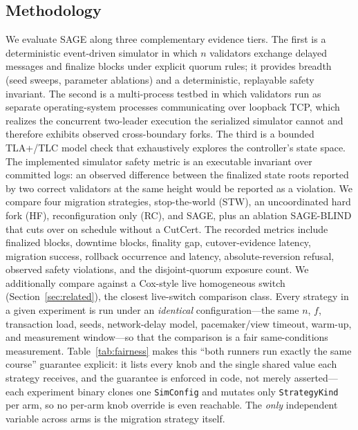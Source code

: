 \documentclass[journal]{IEEEtran}
\theoremstyle{definition}
\theoremstyle{remark}
\begin{document}
\subsection{Methodology}
We evaluate SAGE along three complementary evidence tiers. The first is a
deterministic event-driven simulator in which $n$ validators exchange delayed messages and
finalize blocks under explicit quorum rules; it provides breadth (seed sweeps, parameter
ablations) and a deterministic, replayable safety invariant. The second is a multi-process
testbed in which validators run as separate operating-system processes communicating over
loopback TCP, which realizes the concurrent two-leader execution the serialized simulator cannot
and therefore exhibits observed cross-boundary forks. The third is a bounded TLA+/TLC model check
that exhaustively explores the controller's state space. The implemented simulator safety metric
is an executable invariant over committed logs: an observed difference between the finalized state
roots reported by two correct validators at the same height would be reported as a violation. We compare
four migration strategies, stop-the-world (STW), an uncoordinated hard fork (HF),
reconfiguration only (RC), and SAGE, plus an ablation SAGE-BLIND that cuts over on schedule
without a CutCert. The recorded metrics include finalized blocks, downtime blocks,
finality gap, cutover-evidence latency, migration success, rollback occurrence and latency,
absolute-reversion refusal, observed safety violations, and the disjoint-quorum exposure count.
We additionally compare against a Cox-style live homogeneous switch (Section~\ref{sec:related}),
the closest live-switch comparison class. Every strategy in a given experiment is run under an
\emph{identical} configuration---the same $n$, $f$, transaction load, seeds, network-delay model,
pacemaker/view timeout, warm-up, and measurement window---so that the comparison is a fair
same-conditions measurement. Table~\ref{tab:fairness} makes this ``both runners run exactly the
same course'' guarantee explicit: it lists every knob and the single shared value each strategy
receives, and the guarantee is enforced in code, not merely asserted---each experiment binary
clones one \texttt{SimConfig} and mutates only \texttt{StrategyKind} per arm, so no per-arm knob
override is even reachable. The \emph{only} independent variable across arms is the migration
strategy itself.
\end{document}
